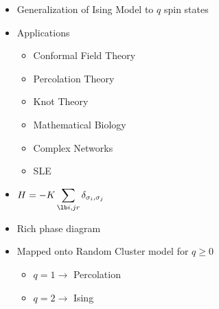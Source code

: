 \documentclass[11pt]{article}
\begin{document}
\begin{itemize}

\item Generalization of Ising Model to $q$ spin states\\
\label{sec-4.1.1.1}


\item Applications\\
\label{sec-4.1.1.2}

\begin{itemize}

\item Conformal Field Theory\\
\label{sec-4.1.1.2.1}


\item Percolation Theory\\
\label{sec-4.1.1.2.2}


\item Knot Theory\\
\label{sec-4.1.1.2.3}


\item Mathematical Biology\\
\label{sec-4.1.1.2.4}


\item Complex Networks\\
\label{sec-4.1.1.2.5}


\item SLE\\
\label{sec-4.1.1.2.6}

\end{itemize} %

\item $H=-K \displaystyle\sum_{\lb i,j r} \delta_{\sigma_i, \sigma_j}$\\
\label{sec-4.1.1.3}


\item Rich phase diagram\\
\label{sec-4.1.1.4}


\item Mapped onto Random Cluster model for $q \ge 0$\\
\label{sec-4.1.1.5}

\begin{itemize}

\item $q = 1 \to$ Percolation\\
\label{sec-4.1.1.5.1}


\item $q = 2 \to$ Ising\\
\label{sec-4.1.1.5.2}


\end{itemize}
\end{itemize}
\end{document}
